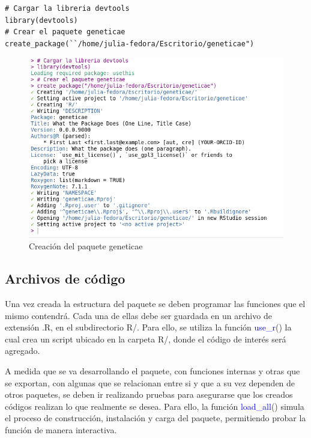 \begin{lstlisting}
# Cargar la libreria devtools
library(devtools)
# Crear el paquete geneticae
create_package(``/home/julia-fedora/Escritorio/geneticae")
\end{lstlisting}


 \begin{figure}[H]
	\begin{center}
		\includegraphics[width=13cm]{./Graficos/creacion.png}	
	\end{center}
	\caption{Creación del paquete geneticae}
	\label{fig:fig32}
\end{figure}


\subsection{Archivos de código}

Una vez creada la estructura del paquete se deben programar las funciones que el mismo contendrá. Cada una de ellas debe ser guardada en un archivo de extensión .R, en el subdirectorio R/. Para ello, se utiliza la función \textcolor{blue}{use\_r}() la cual crea un script ubicado en la carpeta R/, donde el código de interés será agregado. 

A medida que se va desarrollando el paquete, con funciones internas y otras que se exportan, con algunas que se relacionan entre si y que a su vez dependen de otros paquetes, se deben ir realizando pruebas para asegurarse que los creados códigos realizan lo que realmente se desea. Para ello, la función \textcolor{blue}{load\_all}() simula el proceso de construcción, instalación y carga del paquete, permitiendo probar la función de manera interactiva.

